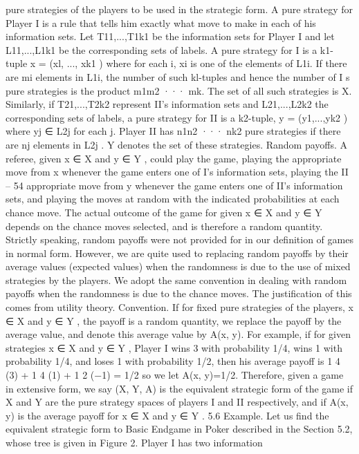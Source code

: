 pure strategies of the players to be used in the strategic form. A pure strategy for Player
I is a rule that tells him exactly what move to make in each of his information sets. Let
T11,...,T1k1 be the information sets for Player I and let L11,...,L1k1 be the corresponding
sets of labels. A pure strategy for I is a k1-tuple x = (xl, ..., xk1 ) where for each i, xi is one
of the elements of L1i. If there are mi elements in L1i, the number of such kl-tuples and
hence the number of I s pure strategies is the product m1m2 ··· mk. The set of all such
strategies is X. Similarly, if T21,...,T2k2 represent II’s information sets and L21,...,L2k2
the corresponding sets of labels, a pure strategy for II is a k2-tuple, y = (y1,...,yk2 ) where
yj ∈ L2j for each j. Player II has n1n2 ··· nk2 pure strategies if there are nj elements in
L2j . Y denotes the set of these strategies.
Random payoffs. A referee, given x ∈ X and y ∈ Y , could play the game, playing the
appropriate move from x whenever the game enters one of I’s information sets, playing the
II – 54
appropriate move from y whenever the game enters one of II’s information sets, and playing
the moves at random with the indicated probabilities at each chance move. The actual
outcome of the game for given x ∈ X and y ∈ Y depends on the chance moves selected,
and is therefore a random quantity. Strictly speaking, random payoffs were not provided
for in our definition of games in normal form. However, we are quite used to replacing
random payoffs by their average values (expected values) when the randomness is due to
the use of mixed strategies by the players. We adopt the same convention in dealing with
random payoffs when the randomness is due to the chance moves. The justification of this
comes from utility theory.
Convention. If for fixed pure strategies of the players, x ∈ X and y ∈ Y , the payoff is
a random quantity, we replace the payoff by the average value, and denote this average
value by A(x, y).
For example, if for given strategies x ∈ X and y ∈ Y , Player I wins 3 with probability
1/4, wins 1 with probability 1/4, and loses 1 with probability 1/2, then his average payoff
is 1
4 (3) + 1
4 (1) + 1
2 (−1) = 1/2 so we let A(x, y)=1/2.
Therefore, given a game in extensive form, we say (X, Y, A) is the equivalent strategic
form of the game if X and Y are the pure strategy spaces of players I and II respectively,
and if A(x, y) is the average payoff for x ∈ X and y ∈ Y .
5.6 Example. Let us find the equivalent strategic form to Basic Endgame in Poker
described in the Section 5.2, whose tree is given in Figure 2. Player I has two information
